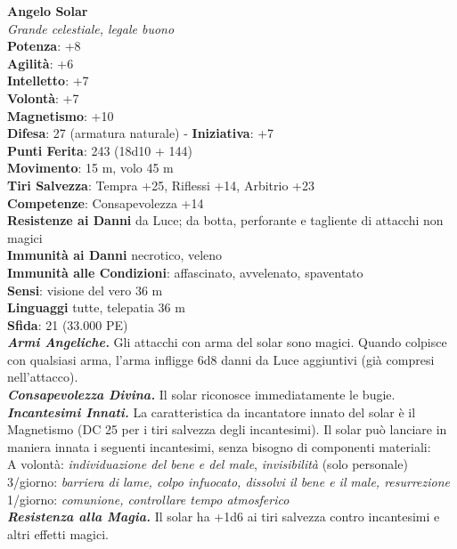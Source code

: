 \begin{multicols}{2}
\medskip\textbf{Angelo Solar}\\
\emph{Grande celestiale, legale buono}\\
\textbf{Potenza}: +8\\
\textbf{Agilità}: +6\\
\textbf{Intelletto}: +7\\
\textbf{Volontà}: +7\\
\textbf{Magnetismo}: +10\\
\textbf{Difesa}: 27 (armatura naturale) - \textbf{Iniziativa}: +7\\
\textbf{Punti Ferita}: 243 (18d10 + 144)\\
\textbf{Movimento}: 15 m, volo 45 m\\
\textbf{Tiri Salvezza}: Tempra +25, Riflessi +14, Arbitrio +23\\
\textbf{Competenze}: Consapevolezza +14\\
\textbf{Resistenze ai Danni} da Luce; da botta, perforante e tagliente di attacchi non magici\\
\textbf{Immunità ai Danni} necrotico, veleno\\
\textbf{Immunità alle Condizioni}: affascinato, avvelenato, spaventato\\
\textbf{Sensi}: visione del vero 36 m\\
\textbf{Linguaggi} tutte, telepatia 36 m\\
\textbf{Sfida}: 21 (33.000 PE)\smallskip\\
\emph{\textbf{Armi Angeliche.}} Gli attacchi con arma del solar sono magici. Quando colpisce con qualsiasi arma, l'arma infligge 6d8 danni da Luce aggiuntivi (già compresi nell'attacco).\\
\emph{\textbf{Consapevolezza Divina.}} Il solar riconosce immediatamente le bugie.\\
\emph{\textbf{Incantesimi Innati.}} La caratteristica da incantatore innato del solar è il Magnetismo (DC 25 per i tiri salvezza degli incantesimi). Il solar può lanciare in maniera innata i seguenti incantesimi, senza bisogno di componenti materiali:\\
A volontà: \emph{individuazione del bene e del male}, \emph{invisibilità} (solo personale)\\
3/giorno: \emph{barriera di lame, colpo infuocato, dissolvi il bene e il} \emph{male, resurrezione}\\
1/giorno: \emph{comunione, controllare tempo atmosferico}\\
\emph{\textbf{Resistenza alla Magia.}} Il solar ha +1d6 ai tiri salvezza contro incantesimi e altri effetti magici.\\

\end{multicols}
